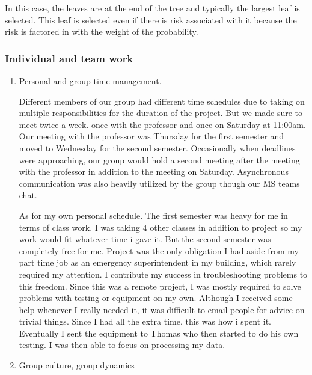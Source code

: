 \documentclass[12pt,a4paper]{report}
\begin{document}
    In this case, the leaves are at the end of the tree and typically the largest leaf is selected. This leaf is selected even if there is risk associated with it because the risk is factored in with the weight of the probability.
    
    \subsubsection{Individual and team work}
        \renewcommand{\theenumi}{\roman{enumi}}
        \begin{enumerate}
            \item Personal and group time management.
            \vspace{2mm}
            
            Different members of our group had different time schedules due to taking on multiple responsibilities for the duration of the project. But we made sure to meet twice a week. once with the professor and once on Saturday at 11:00am. Our meeting with the professor was Thursday for the first semester and moved to Wednesday for the second semester. Occasionally when deadlines were approaching, our group would hold a second meeting after the meeting with the professor in addition to the meeting on Saturday. Asynchronous communication was also heavily utilized by the group though our MS teams chat. \par
            
            As for my own personal schedule. The first semester was heavy for me in terms of class work. I was taking 4 other classes in addition to project so my work would fit whatever time i gave it. But the second semester was completely free for me. Project was the only obligation I had aside from my part time job as an emergency superintendent in my building, which rarely required my attention. I contribute my success in troubleshooting problems to this freedom. Since this was a remote project, I was mostly required to solve problems with testing or equipment on my own. Although I received some help whenever I really needed it, it was difficult to email people for advice on trivial things. Since I had all the extra time, this was how i spent it. Eventually I sent the equipment to Thomas who then started to do his own testing. I was then able to focus on processing my data.
            
            \item Group culture, group dynamics
            \vspace{2mm}
            

\end{enumerate}
\end{document}
